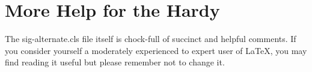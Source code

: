 \documentclass{sig-alternate}
\begin{document}
\section{More Help for the Hardy}
The sig-alternate.cls file itself is chock-full of succinct
and helpful comments.  If you consider yourself a moderately
experienced to expert user of \LaTeX, you may find reading
it useful but please remember not to change it.
\end{document}
